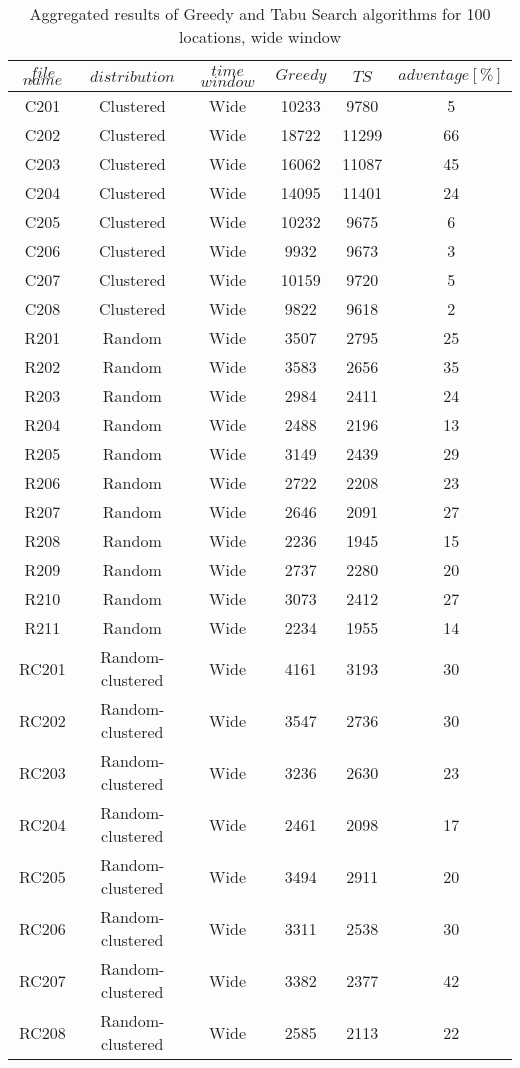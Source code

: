 \begin{table}[t]
\centering
\caption{
Aggregated results of Greedy and Tabu Search algorithms for 100 locations, wide window}
\begin{tabular*}{0.8\linewidth}{@{\extracolsep{\fill}}cccccc}
\toprule
$file$ $name$ & $distribution$ & $time$ $window$ & $Greedy$ & $TS$ & $adventage[\%]$ \\ \midrule
C201 & Clustered & Wide & 10233 & 9780 & 5\\
C202 & Clustered & Wide & 18722 & 11299 & 66\\
C203 & Clustered & Wide & 16062 & 11087 & 45\\
C204 & Clustered & Wide & 14095 & 11401 & 24\\
C205 & Clustered & Wide & 10232 & 9675 & 6\\
C206 & Clustered & Wide & 9932 & 9673 & 3\\
C207 & Clustered & Wide & 10159 & 9720 & 5\\
C208 & Clustered & Wide & 9822 & 9618 & 2\\
R201 & Random & Wide & 3507 & 2795 & 25\\
R202 & Random & Wide & 3583 & 2656 & 35\\
R203 & Random & Wide & 2984 & 2411 & 24\\
R204 & Random & Wide & 2488 & 2196 & 13\\
R205 & Random & Wide & 3149 & 2439 & 29\\
R206 & Random & Wide & 2722 & 2208 & 23\\
R207 & Random & Wide & 2646 & 2091 & 27\\
R208 & Random & Wide & 2236 & 1945 & 15\\
R209 & Random & Wide & 2737 & 2280 & 20\\
R210 & Random & Wide & 3073 & 2412 & 27\\
R211 & Random & Wide & 2234 & 1955 & 14\\
RC201 & Random-clustered & Wide & 4161 & 3193 & 30\\
RC202 & Random-clustered & Wide & 3547 & 2736 & 30\\
RC203 & Random-clustered & Wide & 3236 & 2630 & 23\\
RC204 & Random-clustered & Wide & 2461 & 2098 & 17\\
RC205 & Random-clustered & Wide & 3494 & 2911 & 20\\
RC206 & Random-clustered & Wide & 3311 & 2538 & 30\\
RC207 & Random-clustered & Wide & 3382 & 2377 & 42\\
RC208 & Random-clustered & Wide & 2585 & 2113 & 22\\
\end{tabular*}\end{table}